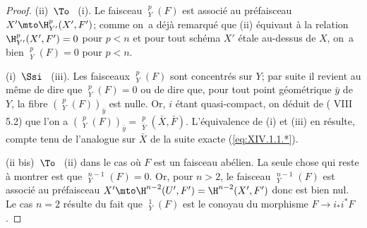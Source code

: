\begin{proof}
\textup{(ii)}~$\To$~ \textup{(i)}. Le faisceau ${\mathop{\underline{\mathrm{H}}}\nolimits}_Y^p(F)$ est associ\'e au pr\'efaisceau $X'\mto \H_{Y'}^p(X', F')$; comme on~a d\'ej\`a remarqu\'e que \textup{(ii)} \'equivaut \`a la relation $\H_{Y'}^p(X', F')=0$ pour $p<n$ et pour tout sch\'ema $X'$ \'etale au-dessus de $X$, on~a bien ${\mathop{\underline{\mathrm{H}}}\nolimits}_Y^p(F)=0$ pour $p<n$.

\textup{(i)}~$\Ssi$~ \textup{(iii)}. Les faisceaux ${\mathop{\underline{\mathrm{H}}}\nolimits}_Y^p(F)$ sont concentr\'es sur $Y$; par suite il revient au m\^eme de dire que ${\mathop{\underline{\mathrm{H}}}\nolimits}_Y^p(F)=0$ ou de dire que, pour tout point g\'eom\'etrique $\bar y$ de $Y$, la fibre $({\mathop{\underline{\mathrm{H}}}\nolimits}_Y^p(F))_{\bar y}$ est nulle. Or, $i$ \'etant quasi-compact, on d\'eduit de ( VIII 5.2) que l'on a $({\mathop{\underline{\mathrm{H}}}\nolimits}_Y^p(F))_{\bar y}={\mathop{\underline{\mathrm{H}}}\nolimits}_{\bar Y}^p(\bar X, \bar F)$. L'\'equivalence de \textup{(i)} et \textup{(iii)} en r\'esulte, compte tenu de l'analogue sur $\bar X$ de la suite exacte (\ref{eq:XIV.1.1.*}).

(ii bis)~$\To$~ \textup{(ii)} dans le cas o\`u $F$ est un faisceau ab\'elien. La seule chose qui reste \`a montrer est que ${\mathop{\underline{\mathrm{H}}}\nolimits}_Y^{n-1}(F)=0$. Or, pour $n>2$, le faisceau ${\mathop{\underline{\mathrm{H}}}\nolimits}_Y^{n-1}(F)$ est associ\'e au pr\'efaisceau $X'\mto \H^{n-2}(U', F')=\H^{n-2}(X', F')$ donc est bien nul. Le cas $n=2$ r\'esulte du fait que ${\mathop{\underline{\mathrm{H}}}\nolimits}_Y^1(F)$ est le conoyau du morphisme $F\to i_*i^*F$.
\skipqed
\end{proof}

